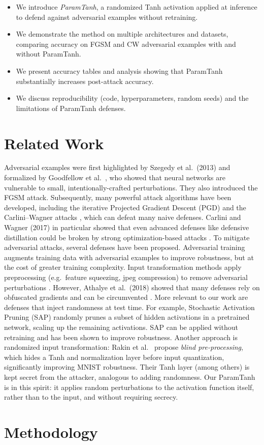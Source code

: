 \documentclass{llncs}
\begin{document}
\begin{itemize}
\item We introduce \emph{ParamTanh}, a randomized Tanh activation applied at inference to defend against adversarial examples without retraining.
\item We demonstrate the method on multiple architectures and datasets, comparing accuracy on FGSM and CW adversarial examples with and without ParamTanh.
\item We present accuracy tables and analysis showing that ParamTanh substantially increases post-attack accuracy.
\item We discuss reproducibility (code, hyperparameters, random seeds) and the limitations of ParamTanh defenses.
\end{itemize} 

\section{Related Work}
Adversarial examples were first highlighted by Szegedy et al.\ (2013) and formalized by Goodfellow et al.\ \cite{Goodfellow2015}, who showed that neural networks are vulnerable to small, intentionally-crafted perturbations. They also introduced the FGSM attack. Subsequently, many powerful attack algorithms have been developed, including the iterative Projected Gradient Descent (PGD) and the Carlini--Wagner attacks \cite{CarliniWagner2017}, which can defeat many naive defenses. Carlini and Wagner (2017) in particular showed that even advanced defenses like defensive distillation could be broken by strong optimization-based attacks \cite{CarliniWagner2017}. To mitigate adversarial attacks, several defenses have been proposed. Adversarial training \cite{Madry2018} augments training data with adversarial examples to improve robustness, but at the cost of greater training complexity. Input transformation methods apply preprocessing (e.g.\ feature squeezing, jpeg compression) to remove adversarial perturbations \cite{Xu2017}. However, Athalye et al.\ (2018) showed that many defenses rely on obfuscated gradients and can be circumvented \cite{Athalye2018}. More relevant to our work are defenses that inject randomness at test time. For example, Stochastic Activation Pruning (SAP) \cite{Dhillon2018} randomly prunes a subset of hidden activations in a pretrained network, scaling up the remaining activations. SAP can be applied without retraining and has been shown to improve robustness\cite{Dhillon2018}. Another approach is randomized input transformation: Rakin et al.\ \cite{Rakin2018} propose \emph{blind pre-processing}, which hides a Tanh and normalization layer before input quantization, significantly improving MNIST robustness. Their Tanh layer (among others) is kept secret from the attacker, analogous to adding randomness. Our ParamTanh is in this spirit: it applies random perturbations to the activation function itself, rather than to the input, and without requiring secrecy. \section{Methodology}
\end{document}
